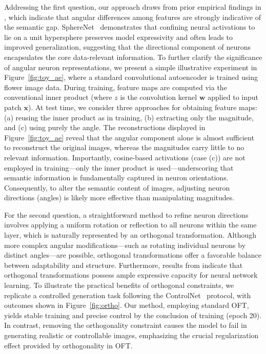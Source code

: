 Addressing the first question, our approach draws from prior empirical findings in \cite{liu2018decoupled,chen2020angular}, which indicate that angular differences among features are strongly indicative of the semantic gap. SphereNet~\cite{liu2017deep} demonstrates that confining neural activations to lie on a unit hypersphere preserves model expressivity and often leads to improved generalization, suggesting that the directional component of neurons encapsulates the core data-relevant information. To further clarify the significance of angular neuron representations, we present a simple illustrative experiment in Figure~\ref{fig:toy_ae}, where a standard convolutional autoencoder is trained using flower image data. During training, feature maps are computed via the conventional inner product (where $z$ is the convolution kernel $\bm{w}$ applied to input patch $\bm{x}$). At test time, we consider three approaches for obtaining feature maps: (a) reusing the inner product as in training, (b) extracting only the magnitude, and (c) using purely the angle. The reconstructions displayed in Figure~\ref{fig:toy_ae} reveal that the angular component alone is almost sufficient to reconstruct the original images, whereas the magnitudes carry little to no relevant information. Importantly, cosine-based activations (case (c)) are not employed in training—only the inner product is used—underscoring that semantic information is fundamentally captured in neuron orientations. Consequently, to alter the semantic content of images, adjusting neuron directions (angles) is likely more effective than manipulating magnitudes.

For the second question, a straightforward method to refine neuron directions involves applying a uniform rotation or reflection to all neurons within the same layer, which is naturally represented by an orthogonal transformation. Although more complex angular modifications—such as rotating individual neurons by distinct angles—are possible, orthogonal transformations offer a favorable balance between adaptability and structure. Furthermore, results from \cite{liu2021orthogonal} indicate that orthogonal transformations possess ample expressive capacity for neural network learning. To illustrate the practical benefits of orthogonal constraints, we replicate a controlled generation task following the ControlNet~\cite{zhang2023adding} protocol, with outcomes shown in Figure~\ref{fig:ortho}. Our method, employing standard OFT, yields stable training and precise control by the conclusion of training (epoch 20). In contrast, removing the orthogonality constraint causes the model to fail in generating realistic or controllable images, emphasizing the crucial regularization effect provided by orthogonality in OFT.

